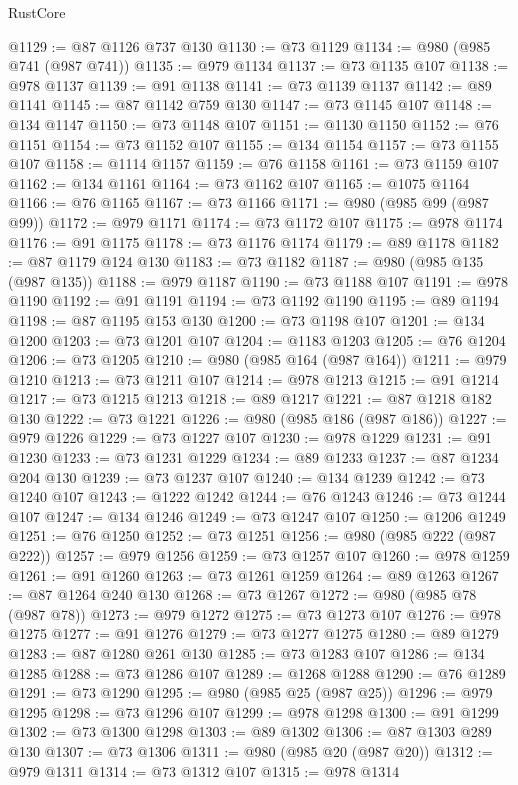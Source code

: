 \begin{lexlean}{RustCore}
\begin{coremodule}
@1129 := @87 @1126 @737 @130
@1130 := @73 @1129
@1134 := @980 (@985 @741 (@987 @741))
@1135 := @979 @1134
@1137 := @73 @1135 @107
@1138 := @978 @1137
@1139 := @91 @1138
@1141 := @73 @1139 @1137
@1142 := @89 @1141
@1145 := @87 @1142 @759 @130
@1147 := @73 @1145 @107
@1148 := @134 @1147
@1150 := @73 @1148 @107
@1151 := @1130 @1150
@1152 := @76 @1151
@1154 := @73 @1152 @107
@1155 := @134 @1154
@1157 := @73 @1155 @107
@1158 := @1114 @1157
@1159 := @76 @1158
@1161 := @73 @1159 @107
@1162 := @134 @1161
@1164 := @73 @1162 @107
@1165 := @1075 @1164
@1166 := @76 @1165
@1167 := @73 @1166
@1171 := @980 (@985 @99 (@987 @99))
@1172 := @979 @1171
@1174 := @73 @1172 @107
@1175 := @978 @1174
@1176 := @91 @1175
@1178 := @73 @1176 @1174
@1179 := @89 @1178
@1182 := @87 @1179 @124 @130
@1183 := @73 @1182
@1187 := @980 (@985 @135 (@987 @135))
@1188 := @979 @1187
@1190 := @73 @1188 @107
@1191 := @978 @1190
@1192 := @91 @1191
@1194 := @73 @1192 @1190
@1195 := @89 @1194
@1198 := @87 @1195 @153 @130
@1200 := @73 @1198 @107
@1201 := @134 @1200
@1203 := @73 @1201 @107
@1204 := @1183 @1203
@1205 := @76 @1204
@1206 := @73 @1205
@1210 := @980 (@985 @164 (@987 @164))
@1211 := @979 @1210
@1213 := @73 @1211 @107
@1214 := @978 @1213
@1215 := @91 @1214
@1217 := @73 @1215 @1213
@1218 := @89 @1217
@1221 := @87 @1218 @182 @130
@1222 := @73 @1221
@1226 := @980 (@985 @186 (@987 @186))
@1227 := @979 @1226
@1229 := @73 @1227 @107
@1230 := @978 @1229
@1231 := @91 @1230
@1233 := @73 @1231 @1229
@1234 := @89 @1233
@1237 := @87 @1234 @204 @130
@1239 := @73 @1237 @107
@1240 := @134 @1239
@1242 := @73 @1240 @107
@1243 := @1222 @1242
@1244 := @76 @1243
@1246 := @73 @1244 @107
@1247 := @134 @1246
@1249 := @73 @1247 @107
@1250 := @1206 @1249
@1251 := @76 @1250
@1252 := @73 @1251
@1256 := @980 (@985 @222 (@987 @222))
@1257 := @979 @1256
@1259 := @73 @1257 @107
@1260 := @978 @1259
@1261 := @91 @1260
@1263 := @73 @1261 @1259
@1264 := @89 @1263
@1267 := @87 @1264 @240 @130
@1268 := @73 @1267
@1272 := @980 (@985 @78 (@987 @78))
@1273 := @979 @1272
@1275 := @73 @1273 @107
@1276 := @978 @1275
@1277 := @91 @1276
@1279 := @73 @1277 @1275
@1280 := @89 @1279
@1283 := @87 @1280 @261 @130
@1285 := @73 @1283 @107
@1286 := @134 @1285
@1288 := @73 @1286 @107
@1289 := @1268 @1288
@1290 := @76 @1289
@1291 := @73 @1290
@1295 := @980 (@985 @25 (@987 @25))
@1296 := @979 @1295
@1298 := @73 @1296 @107
@1299 := @978 @1298
@1300 := @91 @1299
@1302 := @73 @1300 @1298
@1303 := @89 @1302
@1306 := @87 @1303 @289 @130
@1307 := @73 @1306
@1311 := @980 (@985 @20 (@987 @20))
@1312 := @979 @1311
@1314 := @73 @1312 @107
@1315 := @978 @1314

\end{coremodule}
\end{lexlean}
